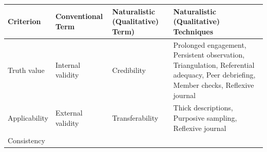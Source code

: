 \documentclass[
  english,
]{book}
\begin{document}
\begin{longtable}[]{@{}llll@{}}
\toprule
\begin{minipage}[b]{0.14\columnwidth}\raggedright
Criterion\strut
\end{minipage} & \begin{minipage}[b]{0.21\columnwidth}\raggedright
Conventional Term\strut
\end{minipage} & \begin{minipage}[b]{0.21\columnwidth}\raggedright
Naturalistic (Qualitative) Term)\strut
\end{minipage} & \begin{minipage}[b]{0.33\columnwidth}\raggedright
Naturalistic (Qualitative) Techniques\strut
\end{minipage}\tabularnewline
\midrule
\endhead
\begin{minipage}[t]{0.14\columnwidth}\raggedright
Truth value\strut
\end{minipage} & \begin{minipage}[t]{0.21\columnwidth}\raggedright
Internal validity\strut
\end{minipage} & \begin{minipage}[t]{0.21\columnwidth}\raggedright
Credibility\strut
\end{minipage} & \begin{minipage}[t]{0.33\columnwidth}\raggedright
Prolonged engagement, Persistent observation, Triangulation, Referential adequacy, Peer debriefing, Member checks, Reflexive journal\strut
\end{minipage}\tabularnewline
\begin{minipage}[t]{0.14\columnwidth}\raggedright
Applicability\strut
\end{minipage} & \begin{minipage}[t]{0.21\columnwidth}\raggedright
External validity\strut
\end{minipage} & \begin{minipage}[t]{0.21\columnwidth}\raggedright
Transferability\strut
\end{minipage} & \begin{minipage}[t]{0.33\columnwidth}\raggedright
Thick descriptions, Purposive sampling, Reflexive journal\strut
\end{minipage}\tabularnewline
\begin{minipage}[t]{0.14\columnwidth}\raggedright
Consistency\strut
\end{minipage} & \begin{minipage}[t]{0.21\columnwidth}\raggedright

\end{minipage}
\end{longtable}
\end{document}
